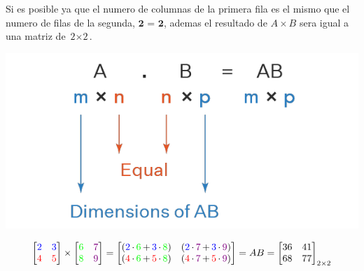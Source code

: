 \documentclass[stu, 12pt, letterpaper, donotrepeattitle, floatsintext, natbib]{apa7}
\begin{document}
Si es posible ya que el numero de columnas de la primera fila es el mismo que el numero de filas de la segunda, $\textbf{2}$ = $\textbf{2}$, ademas el resultado de $A\times B$ sera igual a una matriz de $\textit{2} \times \textit{2}$.
\begin{center}
\includegraphics[scale=0.5]{matrix.png} 
\end{center}

\[
\begin{bmatrix}
   \color{blue} 2 & \color{blue} 3 \\
    \color{red} 4 & \color{red} 5
\end{bmatrix}
\times
\begin{bmatrix}
    \color{green} 6 & \color{violet} 7 \\
    \color{green} 8 & \color{violet} 9
\end{bmatrix}
=
\begin{bmatrix}
    (\color{blue} 2 \textcolor{black}{\,\cdot\,} \color{green} 6 \textcolor{black}{\,+\,} \color{blue} 3 \textcolor{black}{\,\cdot\,} \textcolor{green}{8} \textcolor{black}{)} 
    &
     (\color{blue} 2 \textcolor{black}{\,\cdot\,} \color{violet} 7 \textcolor{black}{\,+\,} \color{blue} 3 \textcolor{black}{\,\cdot\,} \textcolor{violet}{9} \textcolor{black}{)} \\
          
    (\color{red} 4 \textcolor{black}{\,\cdot\,} \color{green} 6 \textcolor{black}{\,+\,} \color{red} 5 \textcolor{black}{\,\cdot\,} \textcolor{green}{8} \textcolor{black}{)}
    &    
    (\color{red} 4 \textcolor{black}{\,\cdot\,} \color{violet} 7 \textcolor{black}{\,+\,} \color{red} 5 \textcolor{black}{\,\cdot\,} \textcolor{violet}{9} \textcolor{black}{)}
\end{bmatrix}
= AB=
\begin{bmatrix}
    36 & 41 \\
    68 & 77
\end{bmatrix}_{2\times2}
\]
\end{document}
